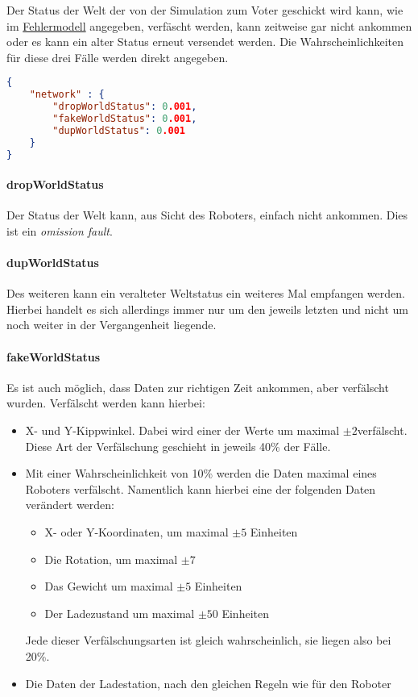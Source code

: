 Der Status der Welt der von der Simulation zum Voter geschickt wird kann, wie im \hyperref[fm]{Fehlermodell} angegeben, verf{\"{a}}scht werden, kann zeitweise gar
nicht ankommen oder es kann ein alter Status erneut versendet werden. Die Wahrscheinlichkeiten f{\"{u}}r diese drei F{\"{a}}lle werden direkt angegeben.
\begin{lstlisting}[frame=single, language=json] 
{
	"network" : {
		"dropWorldStatus": 0.001,
		"fakeWorldStatus": 0.001,
		"dupWorldStatus": 0.001
	}
}
\end{lstlisting}

\paragraph{dropWorldStatus} Der Status der Welt kann, aus Sicht des Roboters, einfach nicht ankommen. Dies
	ist ein \textit{omission fault}.
\paragraph{dupWorldStatus} Des weiteren kann ein veralteter Weltstatus ein weiteres Mal empfangen werden.
    Hierbei handelt es sich allerdings immer nur um den jeweils letzten und nicht um noch weiter in
	der Vergangenheit liegende.
\paragraph{fakeWorldStatus} Es ist auch m{\"{o}}glich, dass Daten zur richtigen Zeit ankommen, aber
    verf{\"{a}}lscht wurden. Verf{\"{a}}lscht werden kann hierbei:
	\begin{itemize}
		\item X- und Y-Kippwinkel. Dabei wird einer der Werte um maximal $\pm 2$\textdegree verf{\"{a}}lscht.
			Diese Art der Verf{\"{a}}lschung geschieht in jeweils 40\% der F{\"{a}}lle.
		\item Mit einer Wahrscheinlichkeit von 10\% werden die Daten maximal eines Roboters verf{\"{a}}lscht.
			Namentlich kann hierbei eine der folgenden Daten ver{\"{a}}ndert werden:
			\begin{itemize}
				\item X- oder Y-Koordinaten, um maximal $\pm 5$ Einheiten
				\item Die Rotation, um maximal $\pm 7$\textdegree
				\item Das Gewicht um maximal $\pm 5$ Einheiten
				\item Der Ladezustand um maximal $\pm 50$ Einheiten
			\end{itemize}
			Jede dieser Verf{\"{a}}lschungsarten ist gleich wahrscheinlich, sie liegen also bei 20\%.
		\item Die Daten der Ladestation, nach den gleichen Regeln wie f{\"{u}}r den Roboter
	\end{itemize}

